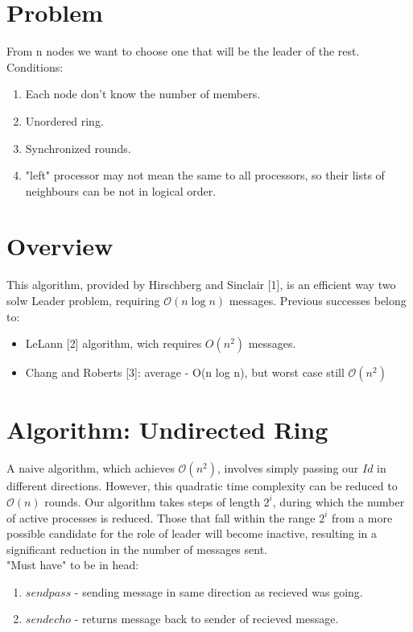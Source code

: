 \documentclass{article}
\begin{document}
\section*{Problem}
From n nodes we want to choose one that will be the leader of the rest. \\
Conditions:
\begin{enumerate}
    \item Each node don't know the number of members.
    \item Unordered ring.
    \item Synchronized rounds.
    \item "left" processor may not mean the same to all processors, so their lists of neighbours can be not in logical order.
\end{enumerate}

\section*{Overview}
This algorithm, provided by  Hirschberg and Sinclair [1], is an efficient way two solw Leader problem, requiring
\(\mathcal{O}(n \log n)\) messages.
Previous successes belong to:
\begin{itemize}
    \item LeLann [2] algorithm, wich requires $O(n^2)$ messages.
    \item Chang and Roberts [3]: average - O(n log n), but worst case still \(\mathcal{O}(n^2)\)
\end{itemize}


\section*{Algorithm: Undirected Ring}
A naive algorithm, which achieves
\(\mathcal{O}(n^2)\), involves simply passing our
$Id$ in different directions. However, this quadratic time complexity can be reduced to \(\mathcal{O}(n)\) rounds. Our algorithm takes steps of length
$2^i$, during which the number of active processes is reduced. Those that fall within the range $2^i$ from a more possible candidate for the role of leader will become inactive, resulting in a significant reduction in the number of messages sent.\\
"Must have" to be in head:
\begin{enumerate}
    \item \(sendpass\) - sending message in same direction as recieved was going.
    \item \(sendecho\) - returns message back to sender of recieved message.
\end{enumerate}
\end{document}
